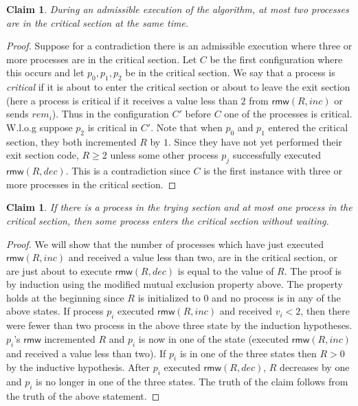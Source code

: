 \documentclass[11pt]{article}
\newcommand\rmw{\mathsf{rmw}}
\newtheorem{claim}[theorem]{Claim}
\begin{document}
\begin{claim}
During an admissible execution of the algorithm, at most two processes are in the critical section at the same time.
\end{claim}
\begin{proof}
Suppose for a contradiction there is an admissible execution where three or more processes are in the critical section. Let $C$ be the first configuration where this occurs and let $p_0, p_1, p_2$ be in the critical section. We say that a process is \emph{critical} if it is about to enter the critical section or about to leave the exit section (here a process is critical if it receives a value less than $2$ from $\rmw(R, inc)$ or sends $rem_i$). Thus in the configuration $C'$ before $C$ one of the processes is critical. W.l.o.g suppose $p_2$ is critical in $C'$. Note that when $p_0$ and $p_1$ entered the critical section, they both incremented $R$ by $1$. Since they have not yet performed their exit section code, $R \geq 2$ unless some other process $p_j$ successfully executed $\rmw(R, dec)$. This is a contradiction since $C$ is the first instance with three or more processes in the critical section.
\end{proof}


\begin{claim}
If there is a process in the trying section and at most one process in the critical section, then some process enters the critical section without waiting.
\end{claim}
\begin{proof}
We will show that the number of processes which have just executed $\rmw(R, inc)$ and received a value less than two, are in the critical section, or are just about to execute $\rmw(R, dec)$ is equal to the value of $R$. The proof is by induction using the modified mutual exclusion property above. The property holds at the beginning since $R$ is initialized to $0$ and no process is in any of the above states. If process $p_i$ executed $\rmw(R, inc)$ and received $v_i < 2$, then there were fewer than two process in the above three state by the induction hypotheses. $p_i$'s $\rmw$ incremented $R$ and $p_i$ is now in one of the state (executed $\rmw(R,inc)$ and received a value less than two). If $p_i$ is in one of the three states then $R > 0$ by the inductive hypothesis. After $p_i$ executed $\rmw(R, dec)$, $R$ decreases by one and $p_i$ is no longer in one of the three states. The truth of the claim follows from the truth of the above statement. 
\end{proof} 
\end{document}
